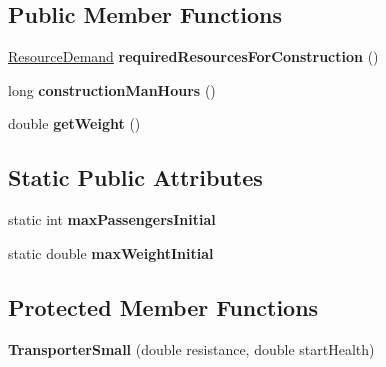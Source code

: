 \subsection*{Public Member Functions}
\begin{DoxyCompactItemize}
\item 
\hyperlink{classuniverse_1_1_resource_demand}{Resource\+Demand} {\bfseries required\+Resources\+For\+Construction} ()\hypertarget{classtools_1_1vehicles_1_1sea_1_1_transporter_small_aa17a8975f7d2adbb9e7899b28f18462e}{}\label{classtools_1_1vehicles_1_1sea_1_1_transporter_small_aa17a8975f7d2adbb9e7899b28f18462e}

\item 
long {\bfseries construction\+Man\+Hours} ()\hypertarget{classtools_1_1vehicles_1_1sea_1_1_transporter_small_a919176220aea3be95d25cdedbc19c0a1}{}\label{classtools_1_1vehicles_1_1sea_1_1_transporter_small_a919176220aea3be95d25cdedbc19c0a1}

\item 
double {\bfseries get\+Weight} ()\hypertarget{classtools_1_1vehicles_1_1sea_1_1_transporter_small_aafd1f2bb4e5a6f38fc46deec679a83e4}{}\label{classtools_1_1vehicles_1_1sea_1_1_transporter_small_aafd1f2bb4e5a6f38fc46deec679a83e4}

\end{DoxyCompactItemize}
\subsection*{Static Public Attributes}
\begin{DoxyCompactItemize}
\item 
static int {\bfseries max\+Passengers\+Initial}\hypertarget{classtools_1_1vehicles_1_1sea_1_1_transporter_small_af38db60a9d1adb5864a97e559fe74988}{}\label{classtools_1_1vehicles_1_1sea_1_1_transporter_small_af38db60a9d1adb5864a97e559fe74988}

\item 
static double {\bfseries max\+Weight\+Initial}\hypertarget{classtools_1_1vehicles_1_1sea_1_1_transporter_small_a15b975323d37c6d763f4c70ffc7879d2}{}\label{classtools_1_1vehicles_1_1sea_1_1_transporter_small_a15b975323d37c6d763f4c70ffc7879d2}

\end{DoxyCompactItemize}
\subsection*{Protected Member Functions}
\begin{DoxyCompactItemize}
\item 
{\bfseries Transporter\+Small} (double resistance, double start\+Health)\hypertarget{classtools_1_1vehicles_1_1sea_1_1_transporter_small_abfa9ee75d433ca4e193ca736b4b626cd}{}\label{classtools_1_1vehicles_1_1sea_1_1_transporter_small_abfa9ee75d433ca4e193ca736b4b626cd}

\end{DoxyCompactItemize}

